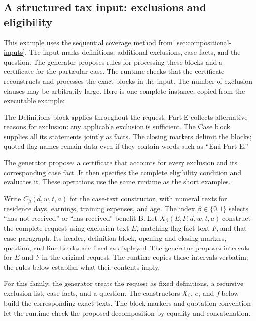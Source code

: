\documentclass[11pt,twoside]{article}
\theoremstyle{definition}
\begin{document}
\subsection{A structured tax input: exclusions and eligibility}
\label{sec:full-tax}

This example uses the sequential coverage method from
\cref{sec:compositional-inputs}. The input marks definitions, additional
exclusions, case facts, and the question. The generator proposes rules for
processing these blocks and a certificate for the particular case. The
runtime checks that the certificate reconstructs and processes the exact
blocks in the input. The number of exclusion clauses may be arbitrarily
large. Here is one complete instance, copied from the executable example:
\begin{quote}

\end{quote}
The Definitions block applies throughout the request. Part E collects
alternative reasons for exclusion: any applicable exclusion is sufficient.
The Case block supplies all its statements jointly as facts. The closing
markers delimit the blocks; quoted flag names remain data even if they
contain words such as ``End Part E.''

The generator proposes a certificate that accounts for every exclusion and
its corresponding case fact. It then specifies the complete eligibility
condition and evaluates it. These operations use the same runtime as the
short examples.

Write $C_{\beta}(d,w,t,a)$ for the case-text constructor, with numeral texts
for residence days, earnings, training expenses, and age. The index
$\beta\in\{0,1\}$ selects ``has not received'' or ``has received'' benefit B.
Let $X_{\beta}(E,F;d,w,t,a)$ construct the complete request using exclusion
text $E$, matching flag-fact text $F$, and that case paragraph. Its header,
definition block, opening and closing markers, question, and line breaks are fixed as displayed. The generator proposes intervals for
$E$ and $F$ in the original request. The runtime copies those intervals
verbatim; the rules below establish what their contents imply.

For this family, the generator treats the request as fixed definitions, a
recursive exclusion list, case facts, and a question. The constructors
$X_\beta$, $e$, and $f$ below build the corresponding exact texts. The block
markers and quotation convention let the runtime check the proposed
decomposition by equality and concatenation.
\end{document}
